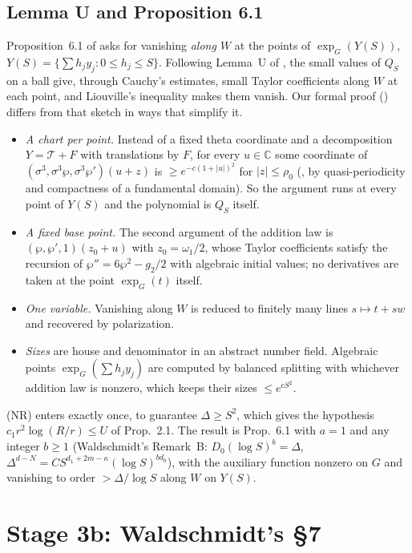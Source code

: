 \documentclass[11pt]{amsart}
\theoremstyle{definition}
\theoremstyle{remark}
\numberwithin{equation}{section}
\newcommand{\CC}{\mathbb{C}}
\newcommand{\NR}{\textup{(NR)}}
\begin{document}
\subsection{Lemma U and Proposition 6.1}
Proposition~6.1 of \cite{W88} asks for vanishing \emph{along $W$} at the points of $\exp_G(Y(S))$, $Y(S)=\{\sum
h_jy_j:0\le h_j\le S\}$. Following Lemma~U of \cite{RPaper}, the small values of $Q_S$ on a ball give,
through Cauchy's estimates, small Taylor coefficients along $W$ at each point, and Liouville's
inequality makes them vanish. Our formal proof () differs from that sketch in ways
that simplify it.
\begin{itemize}
\item \emph{A chart per point.} Instead of a fixed theta coordinate and a decomposition $Y=\mathcal T+F$
with translations by $F$, for every $u\in\CC$ some coordinate of $(\sigma^3,\sigma^3\wp,\sigma^3\wp')(u+z)$ is
$\ge e^{-c(1+|u|)^2}$ for $|z|\le\rho_0$ (, by quasi-periodicity and compactness of a
fundamental domain). So the argument runs at every point of $Y(S)$ and the polynomial is $Q_S$ itself.
\item \emph{A fixed base point.} The second argument of the addition law is $(\wp,\wp',1)(z_0+u)$ with
$z_0=\omega_1/2$, whose Taylor coefficients satisfy the recursion of $\wp''=6\wp^2-g_2/2$ with algebraic
initial values; no derivatives are taken at the point $\exp_G(t)$ itself.
\item \emph{One variable.} Vanishing along $W$ is reduced to finitely many lines $s\mapsto t+sw$ and
recovered by polarization.
\item \emph{Sizes} are house and denominator in an abstract number field. Algebraic points
$\exp_G(\sum h_jy_j)$ are computed by balanced splitting with whichever addition law is nonzero, which
keeps their sizes $\le e^{cS^2}$.
\end{itemize}
\NR{} enters exactly once, to guarantee $\Delta\ge S^2$, which gives the hypothesis $c_1r^2\log(R/r)\le U$ of
Prop.~2.1. The result  is Prop.~6.1 with $a=1$ and any integer $b\ge1$
(Waldschmidt's Remark~B: $D_0(\log S)^b=\Delta$, $\Delta^{d-N}=CS^{d_1+2m-\kappa}(\log S)^{bd_0}$), with the auxiliary
function nonzero on $G$ and vanishing to order $>\Delta/\log S$ along $W$ on $Y(S)$.

\section{Stage 3b: Waldschmidt's \S7}\label{sec:sec7}
\end{document}
